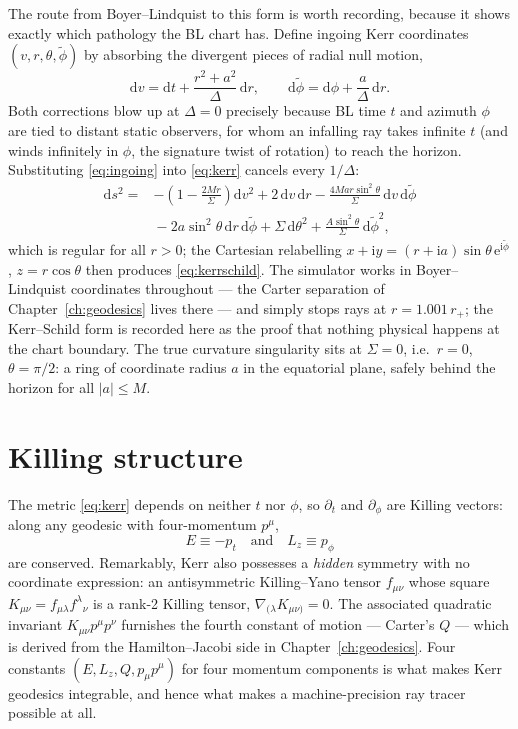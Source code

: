 The route from Boyer--Lindquist to this form is worth recording,
because it shows exactly which pathology the BL chart has. Define
ingoing Kerr coordinates $(v, r, \theta, \tilde\phi)$ by absorbing the
divergent pieces of radial null motion,
\begin{equation}
\mathrm{d}v = \mathrm{d}t + \frac{r^2+a^2}{\Delta}\,\mathrm{d}r,
\qquad
\mathrm{d}\tilde\phi = \mathrm{d}\phi + \frac{a}{\Delta}\,\mathrm{d}r .
\label{eq:ingoing}
\end{equation}
Both corrections blow up at $\Delta = 0$ precisely because BL time $t$
and azimuth $\phi$ are tied to distant static observers, for whom an
infalling ray takes infinite $t$ (and winds infinitely in $\phi$, the
signature twist of rotation) to reach the horizon. Substituting
\eqref{eq:ingoing} into \eqref{eq:kerr} cancels every $1/\Delta$:
\begin{align}
\mathrm{d}s^2 ={}& -\left(1-\frac{2Mr}{\Sigma}\right)\mathrm{d}v^2
+ 2\,\mathrm{d}v\,\mathrm{d}r
- \frac{4Mar\sin^2\theta}{\Sigma}\,\mathrm{d}v\,\mathrm{d}\tilde\phi
\nonumber\\
&{} - 2a\sin^2\theta\,\mathrm{d}r\,\mathrm{d}\tilde\phi
+ \Sigma\,\mathrm{d}\theta^2
+ \frac{A\sin^2\theta}{\Sigma}\,\mathrm{d}\tilde\phi^2 ,
\label{eq:ingoingkerr}
\end{align}
which is regular for all $r > 0$; the Cartesian relabelling
$x + \mathrm{i}y = (r + \mathrm{i}a)\sin\theta\,
\mathrm{e}^{\mathrm{i}\tilde\phi}$, $z = r\cos\theta$ then produces
\eqref{eq:kerrschild}. The
simulator works in Boyer--Lindquist coordinates throughout — the Carter
separation of Chapter~\ref{ch:geodesics} lives there — and simply stops
rays at $r = 1.001\,r_+$; the Kerr--Schild form is recorded here as the
proof that nothing physical happens at the chart boundary. The true
curvature singularity sits at $\Sigma = 0$, i.e.\ $r = 0$,
$\theta = \pi/2$: a ring of coordinate radius $a$ in the equatorial
plane, safely behind the horizon for all $|a| \le M$.

\section{Killing structure}
\label{sec:killing}

The metric \eqref{eq:kerr} depends on neither $t$ nor $\phi$, so
$\partial_t$ and $\partial_\phi$ are Killing vectors: along any geodesic
with four-momentum $p^\mu$,
\begin{equation}
E \equiv -p_t \quad\text{and}\quad L_z \equiv p_\phi
\label{eq:elz}
\end{equation}
are conserved. Remarkably, Kerr also possesses a \emph{hidden} symmetry
with no coordinate expression: an antisymmetric Killing--Yano tensor
$f_{\mu\nu}$ whose square $K_{\mu\nu} = f_{\mu\lambda}f^{\lambda}{}_{\nu}$
is a rank-2 Killing tensor, $\nabla_{(\lambda}K_{\mu\nu)} = 0$. The
associated quadratic invariant $K_{\mu\nu}p^\mu p^\nu$ furnishes the
fourth constant of motion — Carter's $Q$
\citep{Carter1968} — which is derived from the Hamilton--Jacobi side in
Chapter~\ref{ch:geodesics}. Four constants
$(E, L_z, Q, p_\mu p^\mu)$ for four momentum components is what makes
Kerr geodesics integrable, and hence what makes a machine-precision
ray tracer possible at all.

